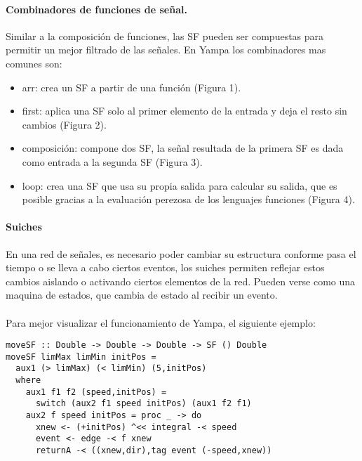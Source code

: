 \documentclass{standalone}
\begin{document}
\paragraph{Combinadores de funciones de señal.}
Similar a la composición de funciones, las SF pueden ser compuestas para permitir un mejor filtrado de las señales. En Yampa los combinadores mas comunes son:

\begin{itemize}
\item arr: crea un SF a partir de una función (Figura 1).
\item first: aplica una SF solo al primer elemento de la entrada y deja el resto sin cambios (Figura 2).
\item composición: compone dos SF, la señal resultada de la primera SF es dada como entrada a la segunda SF (Figura 3).
\item loop: crea una SF que usa su propia salida para calcular su salida, que es posible gracias a la evaluación perezosa de los lenguajes funciones (Figura 4).
\end{itemize}

\paragraph{Suiches}
En una red de señales, es necesario poder cambiar su estructura conforme pasa el tiempo o se lleva a cabo ciertos eventos, los suiches permiten reflejar estos cambios aislando o activando ciertos elementos de la red. Pueden verse como una maquina de estados, que cambia de estado al recibir un evento.

\paragraph{}
Para mejor visualizar el funcionamiento de Yampa, el siguiente ejemplo:

\begin{lstlisting}[frame=single]
moveSF :: Double -> Double -> Double -> SF () Double
moveSF limMax limMin initPos =
  aux1 (> limMax) (< limMin) (5,initPos)
  where
    aux1 f1 f2 (speed,initPos) =
      switch (aux2 f1 speed initPos) (aux1 f2 f1)
    aux2 f speed initPos = proc _ -> do
      xnew <- (+initPos) ^<< integral -< speed
      event <- edge -< f xnew
      returnA -< ((xnew,dir),tag event (-speed,xnew))
\end{lstlisting}
\end{document}

